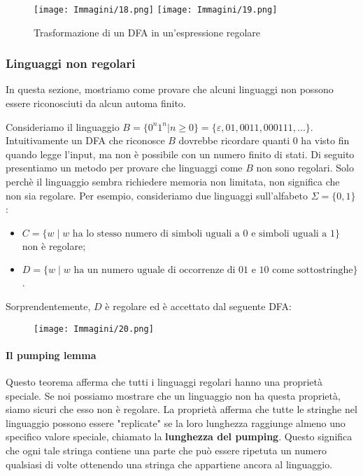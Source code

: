 \documentclass{article}
\begin{document}
\begin{figure}[H]
    \centering
    \texttt{[image: Immagini/18.png]}
    \texttt{[image: Immagini/19.png]}
    \caption{Trasformazione di un DFA in un'espressione regolare}
    \label{fig:your_image}
\end{figure}

\subsubsection{Linguaggi non regolari}

In questa sezione, mostriamo come provare che alcuni linguaggi non possono essere riconosciuti da alcun automa finito.

Consideriamo il linguaggio $B = \{0^{n}1^{n}|n \geq 0\} = \{\varepsilon,01,0011,000111,...\}$. Intuitivamente un DFA che riconosce $B$ dovrebbe ricordare quanti $0$ ha visto fin quando legge l'input, ma non è possibile con un numero finito di stati.
Di seguito presentiamo un metodo per provare che linguaggi come $B$ non sono regolari.
Solo perchè il linguaggio sembra richiedere memoria non limitata, non significa che non sia regolare.
Per esempio, consideriamo due linguaggi sull'alfabeto $\Sigma = \{0,1\}$:
\begin{itemize}
    \item $C = \{w \mid w \text{ ha lo stesso numero di simboli uguali a 0 e simboli uguali a 1}\}$ non è regolare;
    \item $D = \{w \mid w \text{ ha un numero uguale di occorrenze di 01 e 10 come sottostringhe}\}$.
\end{itemize}

Sorprendentemente, $D$ è regolare ed è accettato dal seguente DFA:

\begin{figure}[H]
    \centering
    \texttt{[image: Immagini/20.png]}
    \label{fig:your_image}
\end{figure}

\paragraph{Il pumping lemma}
\text{ }

Questo teorema afferma che tutti i linguaggi regolari hanno una proprietà speciale. Se noi possiamo mostrare che un linguaggio non ha questa proprietà, siamo sicuri che esso non è regolare. La proprietà afferma che tutte le stringhe nel linguaggio possono essere "replicate" se la loro lunghezza raggiunge almeno uno specifico valore speciale, chiamato la \textbf{lunghezza del pumping}. Questo significa che ogni tale stringa contiene una parte che può essere ripetuta un numero qualsiasi di volte ottenendo una stringa che appartiene ancora al linguaggio.
\end{document}
